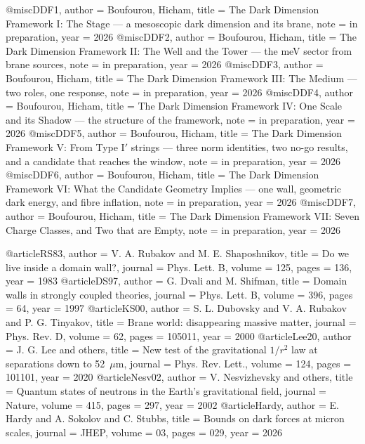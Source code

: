 @misc{DDF1, author = {Boufourou, Hicham}, title = {The Dark Dimension Framework I: The Stage --- a mesoscopic dark dimension and its brane}, note = {in preparation}, year = {2026}}
@misc{DDF2, author = {Boufourou, Hicham}, title = {The Dark Dimension Framework II: The Well and the Tower --- the meV sector from brane sources}, note = {in preparation}, year = {2026}}
@misc{DDF3, author = {Boufourou, Hicham}, title = {The Dark Dimension Framework III: The Medium --- two roles, one response}, note = {in preparation}, year = {2026}}
@misc{DDF4, author = {Boufourou, Hicham}, title = {The Dark Dimension Framework IV: One Scale and its Shadow --- the structure of the framework}, note = {in preparation}, year = {2026}}
@misc{DDF5, author = {Boufourou, Hicham}, title = {The Dark Dimension Framework V: From Type I$'$ strings --- three norm identities, two no-go results, and a candidate that reaches the window}, note = {in preparation}, year = {2026}}
@misc{DDF6, author = {Boufourou, Hicham}, title = {The Dark Dimension Framework VI: What the Candidate Geometry Implies --- one wall, geometric dark energy, and fibre inflation}, note = {in preparation}, year = {2026}}
@misc{DDF7, author = {Boufourou, Hicham}, title = {The Dark Dimension Framework VII: Seven Charge Classes, and Two that are Empty}, note = {in preparation}, year = {2026}}

@article{RS83, author = {V. A. Rubakov and M. E. Shaposhnikov}, title = {Do we live inside a domain wall?}, journal = {Phys. Lett. B}, volume = {125}, pages = {136}, year = {1983}}
@article{DS97, author = {G. Dvali and M. Shifman}, title = {Domain walls in strongly coupled theories}, journal = {Phys. Lett. B}, volume = {396}, pages = {64}, year = {1997}}
@article{KS00, author = {S. L. Dubovsky and V. A. Rubakov and P. G. Tinyakov}, title = {Brane world: disappearing massive matter}, journal = {Phys. Rev. D}, volume = {62}, pages = {105011}, year = {2000}}
@article{Lee20, author = {J. G. Lee and others}, title = {New test of the gravitational $1/r^2$ law at separations down to 52~$\mu$m}, journal = {Phys. Rev. Lett.}, volume = {124}, pages = {101101}, year = {2020}}
@article{Nesv02, author = {V. Nesvizhevsky and others}, title = {Quantum states of neutrons in the Earth's gravitational field}, journal = {Nature}, volume = {415}, pages = {297}, year = {2002}}
@article{Hardy, author = {E. Hardy and A. Sokolov and C. Stubbs}, title = {Bounds on dark forces at micron scales}, journal = {JHEP}, volume = {03}, pages = {029}, year = {2026}}

